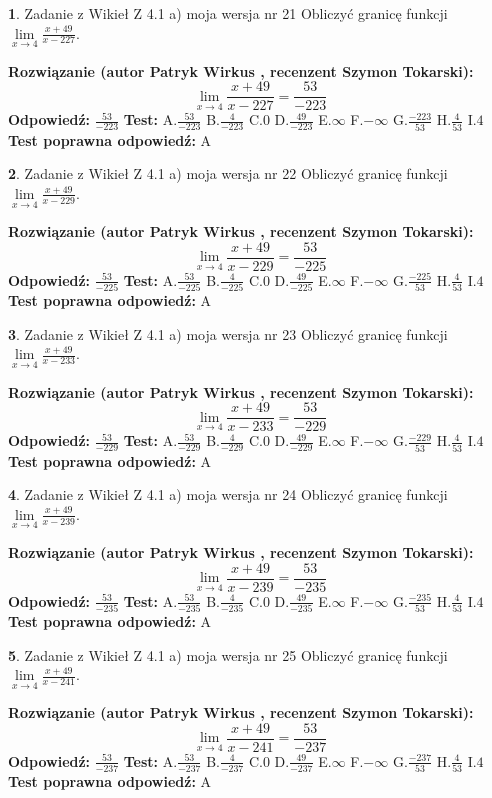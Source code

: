 \documentclass[12pt, a4paper]{article}
\theoremstyle{definition} %
\newtheorem{zad}{}
\newcommand{\zadStart}[1]{\begin{zad}#1\newline}
\newcommand{\zadStop}{\end{zad}}
\newcommand{\rozwStart}[2]{\noindent \textbf{Rozwiązanie (autor #1 , recenzent #2): }\newline}
\newcommand{\rozwStop}{\newline}
\newcommand{\odpStart}{\noindent \textbf{Odpowiedź:}\newline}
\newcommand{\odpStop}{\newline}
\newcommand{\testStart}{\noindent \textbf{Test:}\newline}
\newcommand{\testStop}{\newline}
\newcommand{\kluczStart}{\noindent \textbf{Test poprawna odpowiedź:}\newline}
\newcommand{\kluczStop}{\newline}
\begin{document}
\zadStart{Zadanie z Wikieł Z 4.1 a) moja wersja nr 21}
Obliczyć granicę funkcji $\lim\limits_{x\to4}\frac{x+49}{x-227}$.
\zadStop
\rozwStart{Patryk Wirkus}{Szymon Tokarski}
$$\lim\limits_{x\to4}\frac{x+49}{x-227} = \frac{53}{-223}$$
\rozwStop
\odpStart
$\frac{53}{-223}$
\odpStop
\testStart
A.$\frac{53}{-223}$
B.$\frac{4}{-223}$
C.$0$
D.$\frac{49}{-223}$
E.$\infty$
F.$-\infty$
G.$\frac{-223}{53}$
H.$\frac{4}{53}$
I.$4$
\testStop
\kluczStart
A
\kluczStop



\zadStart{Zadanie z Wikieł Z 4.1 a) moja wersja nr 22}
Obliczyć granicę funkcji $\lim\limits_{x\to4}\frac{x+49}{x-229}$.
\zadStop
\rozwStart{Patryk Wirkus}{Szymon Tokarski}
$$\lim\limits_{x\to4}\frac{x+49}{x-229} = \frac{53}{-225}$$
\rozwStop
\odpStart
$\frac{53}{-225}$
\odpStop
\testStart
A.$\frac{53}{-225}$
B.$\frac{4}{-225}$
C.$0$
D.$\frac{49}{-225}$
E.$\infty$
F.$-\infty$
G.$\frac{-225}{53}$
H.$\frac{4}{53}$
I.$4$
\testStop
\kluczStart
A
\kluczStop



\zadStart{Zadanie z Wikieł Z 4.1 a) moja wersja nr 23}
Obliczyć granicę funkcji $\lim\limits_{x\to4}\frac{x+49}{x-233}$.
\zadStop
\rozwStart{Patryk Wirkus}{Szymon Tokarski}
$$\lim\limits_{x\to4}\frac{x+49}{x-233} = \frac{53}{-229}$$
\rozwStop
\odpStart
$\frac{53}{-229}$
\odpStop
\testStart
A.$\frac{53}{-229}$
B.$\frac{4}{-229}$
C.$0$
D.$\frac{49}{-229}$
E.$\infty$
F.$-\infty$
G.$\frac{-229}{53}$
H.$\frac{4}{53}$
I.$4$
\testStop
\kluczStart
A
\kluczStop



\zadStart{Zadanie z Wikieł Z 4.1 a) moja wersja nr 24}
Obliczyć granicę funkcji $\lim\limits_{x\to4}\frac{x+49}{x-239}$.
\zadStop
\rozwStart{Patryk Wirkus}{Szymon Tokarski}
$$\lim\limits_{x\to4}\frac{x+49}{x-239} = \frac{53}{-235}$$
\rozwStop
\odpStart
$\frac{53}{-235}$
\odpStop
\testStart
A.$\frac{53}{-235}$
B.$\frac{4}{-235}$
C.$0$
D.$\frac{49}{-235}$
E.$\infty$
F.$-\infty$
G.$\frac{-235}{53}$
H.$\frac{4}{53}$
I.$4$
\testStop
\kluczStart
A
\kluczStop



\zadStart{Zadanie z Wikieł Z 4.1 a) moja wersja nr 25}
Obliczyć granicę funkcji $\lim\limits_{x\to4}\frac{x+49}{x-241}$.
\zadStop
\rozwStart{Patryk Wirkus}{Szymon Tokarski}
$$\lim\limits_{x\to4}\frac{x+49}{x-241} = \frac{53}{-237}$$
\rozwStop
\odpStart
$\frac{53}{-237}$
\odpStop
\testStart
A.$\frac{53}{-237}$
B.$\frac{4}{-237}$
C.$0$
D.$\frac{49}{-237}$
E.$\infty$
F.$-\infty$
G.$\frac{-237}{53}$
H.$\frac{4}{53}$
I.$4$
\testStop
\kluczStart
A
\kluczStop
\end{document}
